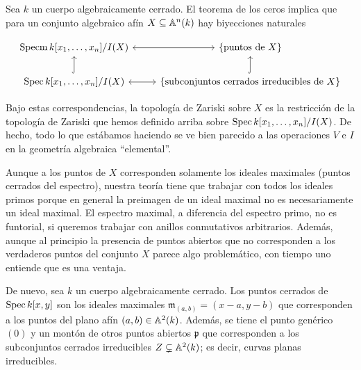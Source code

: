 \documentclass{article}
\numberwithin{equation}{section}
\theoremstyle{definition}
\begin{document}

\begin{ejemplo}
  Sea $k$ un cuerpo algebraicamente cerrado. El teorema de los ceros implica que
  para un conjunto algebraico afín $X \subseteq \AA^n (k)$ hay biyecciones
  naturales

  \[ \begin{tikzcd}
      \Specm k [x_1,\ldots,x_n]/I(X) \ar[<->]{r} & \{ \text{puntos de }X \} \\
      \Spec k [x_1,\ldots,x_n]/I(X) \ar[<->]{r}\ar[hookrightarrow]{u} & \{ \text{subconjuntos cerrados irreducibles de }X \}\ar[hookrightarrow]{u} 
    \end{tikzcd} \]

  Bajo estas correspondencias, la topología de Zariski sobre $X$ es
  la restricción de la topología de Zariski que hemos definido arriba sobre
  $\Spec k [x_1,\ldots,x_n]/I(X)$. De hecho, todo lo que estábamos haciendo
  se ve bien parecido a las operaciones $V$ e $I$ en la geometría algebraica
  ``elemental''.

  Aunque a los puntos de $X$ corresponden solamente los ideales maximales
  (puntos cerrados del espectro), nuestra teoría tiene que trabajar con todos
  los ideales primos porque en general la preimagen de un ideal maximal no es
  necesariamente un ideal maximal. El espectro maximal, a diferencia del
  espectro primo, no es funtorial, si queremos trabajar con anillos conmutativos
  arbitrarios. Además, aunque al principio la presencia de puntos abiertos que
  no corresponden a los verdaderos puntos del conjunto $X$ parece algo
  problemático, con tiempo uno entiende que es una ventaja.
\end{ejemplo}

\begin{ejemplo}
  De nuevo, sea $k$ un cuerpo algebraicamente cerrado. Los puntos cerrados de
  $\Spec k [x,y]$ son los ideales maximales $\mathfrak{m}_{(a,b)} = (x-a,y-b)$
  que corresponden a los puntos del plano afín $(a,b) \in \AA^2 (k)$. Además,
  se tiene el punto genérico $(0)$ y un montón de otros puntos abiertos
  $\mathfrak{p}$ que corresponden a los subconjuntos cerrados irreducibles
  $Z \subsetneq \AA^2 (k)$; es decir, curvas planas irreducibles.
\end{ejemplo}
\end{document}
